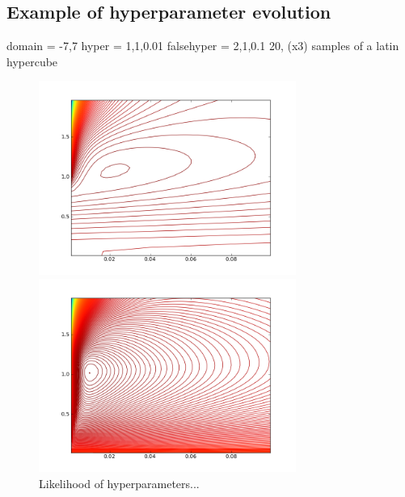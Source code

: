\documentclass[phd,tocprelim]{cornell}
\begin{document}
\subsection{Example of hyperparameter evolution}

domain = -7,7
hyper = 1,1,0.01
falsehyper = 2,1,0.1
20, (x3) samples of a latin hypercube

\begin{figure}[hpt]
 	\centerline{\includegraphics[width=0.75\textwidth]{figures/EPI/hyper_update_loglike_20s.png}}
    \centerline{\includegraphics[width=0.75\textwidth]{figures/EPI/hyper_update_loglike_60s.png}}
    \caption[Likelihood of hyperparameters]{Likelihood of hyperparameters...}
 	\label{fig:EPI_hyper_1}
\end{figure}
\end{document}
